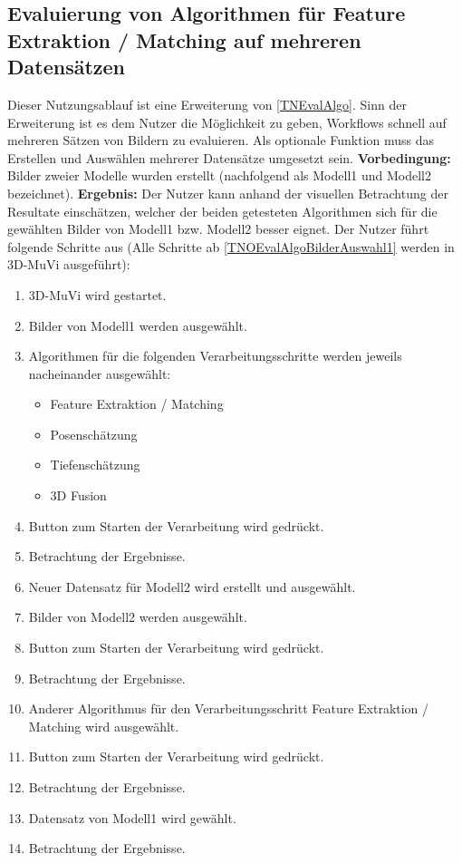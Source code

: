 \subsection{Evaluierung von Algorithmen für Feature Extraktion / Matching auf mehreren Datensätzen}
Dieser Nutzungsablauf ist eine Erweiterung von \ref{TNEvalAlgo}. Sinn der Erweiterung ist es dem Nutzer die Möglichkeit zu geben, Workflows schnell auf mehreren Sätzen von Bildern zu evaluieren. Als optionale Funktion muss das Erstellen und Auswählen mehrerer Datensätze umgesetzt sein.\newline
\textbf{Vorbedingung:} Bilder zweier Modelle wurden erstellt (nachfolgend als Modell1 und Modell2 bezeichnet). \newline
\textbf{Ergebnis:} Der Nutzer kann anhand der visuellen Betrachtung der Resultate einschätzen, welcher der beiden getesteten Algorithmen sich für die gewählten Bilder von Modell1 bzw. Modell2 besser eignet. \newline
Der Nutzer führt folgende Schritte aus (Alle Schritte ab \ref{TNOEvalAlgoBilderAuswahl1} werden in 3D-MuVi ausgeführt):
\begin{enumerate}
	\item 3D-MuVi wird gestartet.
	\item \label{TNOEvalAlgoBilderAuswahl1} Bilder von Modell1 werden ausgewählt.
	\item Algorithmen für die folgenden Verarbeitungsschritte werden jeweils nacheinander ausgewählt:
	\begin{itemize}
		\item Feature Extraktion / Matching
		\item Posenschätzung
		\item Tiefenschätzung
		\item 3D Fusion
	\end{itemize}
	\item Button zum Starten der Verarbeitung wird gedrückt.
	\item Betrachtung der Ergebnisse.
	\item Neuer Datensatz für Modell2 wird erstellt und ausgewählt.
	\item Bilder von Modell2 werden ausgewählt.
	\item Button zum Starten der Verarbeitung wird gedrückt.
	\item Betrachtung der Ergebnisse.
	\item Anderer Algorithmus für den Verarbeitungsschritt Feature Extraktion / Matching wird ausgewählt.
	\item Button zum Starten der Verarbeitung wird gedrückt.
	\item Betrachtung der Ergebnisse.
	\item Datensatz von Modell1 wird gewählt.
	\item Betrachtung der Ergebnisse.
\end{enumerate}
